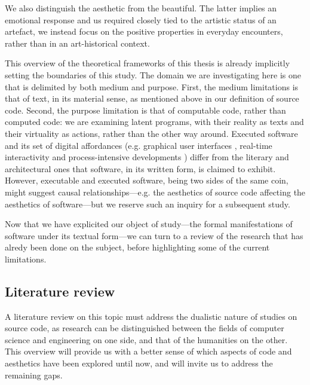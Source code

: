 We also distinguish the aesthetic from the beautiful. The latter implies an emotional response and us required closely tied to the artistic status of an artefact, we instead focus on the positive properties in everyday encounters, rather than in an art-historical context.

This overview of the theoretical frameworks of this thesis is already implicitly setting the boundaries of this study. The domain we are investigating here is one that is delimited by both medium and purpose. First, the medium limitations is that of text, in its material sense, as mentioned above in our definition of source code. Second, the purpose limitation is that of computable code, rather than computed code: we are examining latent programs, with their reality as texts and their virtuality as actions, rather than the other way around. Executed software and its set of digital affordances (e.g. graphical user interfaces \citep{gelernter_machine_1998}, real-time interactivity \citep{laurel_computers_1993} and process-intensive developments \citep{murray_hamlet_1998}) differ from the literary and architectural ones that software, in its written form, is claimed to exhibit. However, executable and executed software, being two sides of the same coin, might suggest causal relationships—e.g. the aesthetics of source code affecting the aesthetics of software—but we reserve such an inquiry for a subsequent study.

Now that we have explicited our object of study—the formal manifestations of software under its textual form—we can turn to a review of the research that has alredy been done on the subject, before highlighting some of the current limitations.

\subsection{Literature review}
\label{subsec:literature-review}

A literature review on this topic must address the dualistic nature of studies on source code, as research can be distinguished between the fields of computer science and engineering on one side, and that of the humanities on the other. This overview will provide us with a better sense of which aspects of code and aesthetics have been explored until now, and will invite us to address the remaining gaps.

